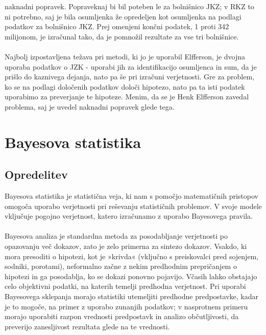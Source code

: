 \documentclass[12pt,a4paper]{amsart}
\theoremstyle{definition} %
\theoremstyle{plain} %
\begin{document}
naknadni popravek. Popraveknaj bi bil poteben le za bolnišnico JKZ; v RKZ to ni potrebno, saj je bila osumljenka že opredeljen kot osumljenka 
na podlagi podatkov za bolnišnico JKZ. Prej omenjeni končni podatek, 1 proti 342 milijonom, je izračunal tako, da je pomnožil rezultate za vse 
tri bolnišnice.\\\\
Najbolj izpostavljena težava pri metodi, ki jo je uporabil Elfferson, je dvojna uporaba podatkov o JZK - uporabi jih za identifikacijo osumljenca 
in sum, da je prišlo do kaznivega dejanja, nato pa še pri izračuni verjetnosti. Gre za problem, ko se na podlagi določenih podatkov določi hipotezo, nato 
pa ta isti podatek uporabimo za preverjanje te hipoteze. Menim, da se je Henk Elfferson zavedal problema, saj je uvedel naknadni popravek glede tega. 

\section{Bayesova statistika}

\subsection{Opredelitev}
Bayesova statistika je statistična veja, ki nam s pomočjo matematičnih pristopov omogoča uporabo verjetnosti pri reševanju statističnih
problemov. V svoje modele vključuje pogojno verjetnost, katero izračunamo z uporabo Bayesovega pravila. \\\\
Bayesova analiza je standardna metoda za posodabljanje verjetnosti po opazovanju več dokazov, zato je zelo primerna za sintezo dokazov.
Vsakdo, ki mora presoditi o hipotezi, kot je »krivda« (vključno s preiskovalci pred sojenjem, sodniki, porotami), neformalno začne z nekim
predhodnim prepričanjem o hipotezi in ga posodablja, ko se dokazi ponovno pojavijo. Včasih lahko obstajajo celo objektivni podatki, na katerih temelji
predhodna verjetnost. Pri uporabi Bayesovega sklepanja morajo statistiki utemeljiti predhodne predpostavke, kadar je to mogoče, na primer z
uporabo zunanjih podatkov; v nasprotnem primeru morajo uporabiti razpon vrednosti predpostavk in analizo občutljivosti, da preverijo zanesljivost rezultata
glede na te vrednosti.
\end{document}
